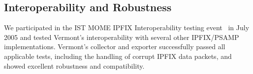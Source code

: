 \subsection{Interoperability and Robustness}

We participated in the IST MOME IPFIX Interoperability testing event~\cite{mome-interop} in July 2005 and tested Vermont's interoperability with several other IPFIX/PSAMP implementations. 
Vermont's collector and exporter successfully passed all applicable tests, including the handling of corrupt IPFIX data packets, and showed excellent robustness and compatibility.

